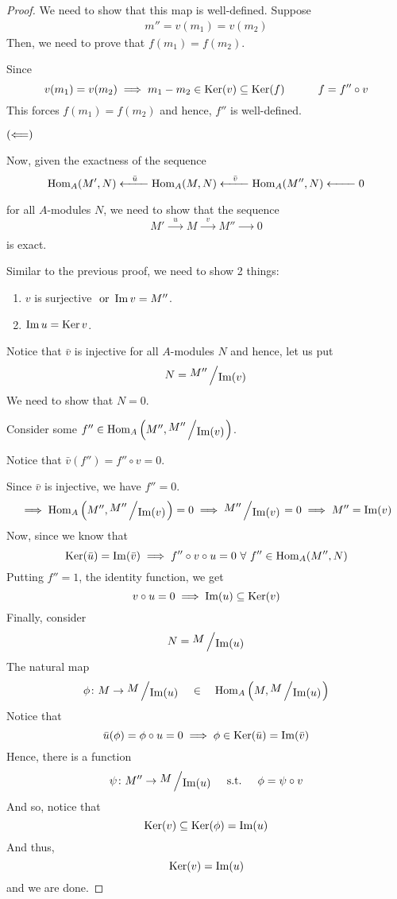 \begin{proof}
	We need to show that this map is well-defined.
	Suppose
	\begin{align*}
		m'' = v(m_1) = v(m_2)
	\end{align*}
	Then, we need to prove that \(f(m_1) = f(m_2)\).

	Since
	\[
		v(m_1) = v(m_2) \implies m_1 - m_2 \in \operatorname{Ker}(v) \subseteq \operatorname{Ker}(f)
		\quad\quad\quad f = f'' \circ v
	\]
	This forces \(f(m_1) = f(m_2)\) and hence, \(f''\) is well-defined.

	\vspace{3em}

	\(\left( \Longleftarrow \right)\)

	Now, given the exactness of the sequence
	\[
		\operatorname{Hom}_A(M', N) \xleftarrow[\quad\quad]{\bar{u}} \operatorname{Hom}_A(M, N)
		\xleftarrow[\quad\quad]{\bar{v}} \operatorname{Hom}_A(M'', N)
		\xleftarrow[\quad\quad]{} 0
	\]
	for all \(A\)-modules \(N\), we need to show that the sequence
	\[
		M' \xrightarrow[\quad\quad]{u}
		M \xrightarrow[\quad\quad]{v} M'' \xrightarrow[\quad\quad]{} 0
	\]
	is exact.

	Similar to the previous proof, we need to show 2 things:
	\begin{enumerate}
		\item \(v\) is surjective \(\text{ or } \operatorname{Im} v = M''\).
		\item \(\operatorname{Im} u = \operatorname{Ker} v\).
	\end{enumerate}

	Notice that \(\bar{v}\) is injective for all \(A\)-modules \(N\)
	and hence, let us put
	\[
		N = \bigslant{M''}{\Img(v)}
	\]
	We need to show that \(N = 0\).

	Consider some \(f'' \in \Hom_A \brak{M'', \bigslant{M''}{\Img(v)}}\).

	Notice that \(\bar{v}(f'') = f'' \circ v = 0\).

	Since \(\bar{v}\) is injective, we have \(f'' = 0\).
	\[
		\implies \Hom_A \brak{M'', \bigslant{M''}{\Img(v)}} = 0
		\implies \bigslant{M''}{\Img(v)} = 0
		\implies M'' = \Img(v)
	\]
	Now, since we know that
	\[
		\operatorname{Ker}(\bar{u}) = \operatorname{Im}(\bar{v})
		\implies f'' \circ v \circ u = 0 \ \forall\ f'' \in \operatorname{Hom}_A(M'', N)
	\]
	Putting \(f'' = 1\), the identity function, we get
	\[
		v \circ u = 0 \implies \operatorname{Im}(u) \subseteq \operatorname{Ker}(v)
	\]
	Finally, consider
	\[
		N = \bigslant{M}{\Img(u)}
	\]
	The natural map
	\[
		\phi \colon M \to \bigslant{M}{\Img(u)}
		\quad \in \quad \Hom_A \brak{M, \bigslant{M}{\Img(u)}}
	\]
	Notice that
	\[
		\bar{u}(\phi) = \phi \circ u = 0 \implies
		\phi \in \operatorname{Ker}(\bar{u}) = \operatorname{Im}(\bar{v})
	\]
	Hence, there is a function
	\[
		\psi \colon M'' \to \bigslant{M}{\Img(u)}
		\qstq \phi = \psi \circ v
	\]
	And so, notice that
	\[
		\operatorname{Ker}(v) \subseteq \operatorname{Ker}(\phi) = \operatorname{Im}(u)
	\]
	And thus,
	\[
		\operatorname{Ker}(v) = \operatorname{Im}(u)
	\]
	and we are done.
\end{proof}

